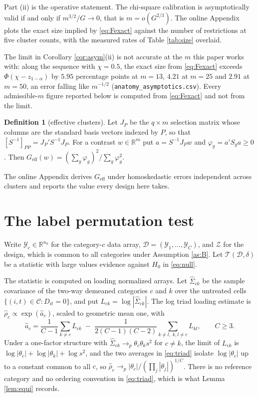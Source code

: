 \documentclass[12pt]{article}
\theoremstyle{definition}
\newtheorem{definition}{Definition}
\numberwithin{equation}{section}
\begin{document}
Part (ii) is the operative statement. The chi-square calibration is
asymptotically valid if and only if $m^{3/2}/G \to 0$, that is $m = o(G^{2/3})$. The online Appendix plots the exact size implied by \eqref{eq:Fexact} against the number of restrictions at five cluster counts, with the measured rates of Table \ref{tab:size} overlaid.

The limit in Corollary \ref{cor:asym}(ii) is not accurate at the $m$ this paper
works with: along the sequence with $\chi = 0.5$, the exact size from \eqref{eq:Fexact}
exceeds $\Phi(\chi - z_{1-\alpha})$ by $5.95$ percentage points at $m = 13$,
$4.21$ at $m = 25$ and $2.91$ at $m = 50$, an error falling like $m^{-1/2}$
(\texttt{anatomy\_asymptotics.csv}). Every admissible-$m$ figure reported below
is computed from \eqref{eq:Fexact} and not from the limit.

\begin{definition}[effective clusters]
\label{def:geff}
Let $J_P$ be the $q \times m$ selection matrix whose columns are the standard
basis vectors indexed by $P$, so that $[S^{-1}]_{PP} = J_P'S^{-1}J_P$. For a
contrast $w \in \mathbb{R}^m$ put $a = S^{-1}J_P w$ and $\varphi_g = a'S_g a
\ge 0$. Then $G_{\mathrm{eff}}(w) = (\sum_g \varphi_g)^2 / \sum_g
\varphi_g^2$.
\end{definition}

The online Appendix derives $G_{\mathrm{eff}}$ under homoskedastic errors
independent across clusters and reports the value every design here takes.

\section{The label permutation test}
\label{sec:perm}

Write $\mathcal{Y}_c \in \mathbb{R}^{n_0}$ for the category-$c$ data array,
$\mathcal{D} = (\mathcal{Y}_1,\dots,\mathcal{Y}_C)$, and $\mathcal{Z}$ for the
design, which is common to all categories under Assumption \ref{as:B}. Let
$\mathcal{T}(\mathcal{D},\delta)$ be a statistic with large values evidence
against $H_0$ in \eqref{eq:null}.

The statistic is computed on loading normalized arrays. Let
$\hat{\Sigma}_{ck}$ be the sample covariance of the two-way demeaned categories
$c$ and $k$ over the untreated cells $\{(i,t) \in \mathcal{C}: D_{it} = 0\}$,
and put $L_{ck} = \log|\hat{\Sigma}_{ck}|$. The log triad loading estimate is
$\hat{\rho}_c \propto \exp(\hat{a}_c)$, scaled to geometric mean one, with
\begin{equation}
\hat{a}_c = \frac{1}{C-1}\sum_{k \ne c} L_{ck}
 \;-\; \frac{1}{2(C-1)(C-2)} \sum_{k \ne l,\; k,l \ne c} L_{kl} ,
\qquad C \ge 3 .
\label{eq:triad}
\end{equation}
Under a one-factor structure with $\hat{\Sigma}_{ck} \to_p \theta_c\theta_k s^2$
for $c \ne k$, the limit of $L_{ck}$ is $\log|\theta_c| + \log|\theta_k| +
\log s^2$, and the two averages in \eqref{eq:triad} isolate $\log|\theta_c|$ up
to a constant common to all $c$, so $\hat{\rho}_c \to_p |\theta_c| /
(\prod_j |\theta_j|)^{1/C}$. There is no reference category and no ordering
convention in \eqref{eq:triad}, which is what Lemma \ref{lem:equi} records.
\end{document}
